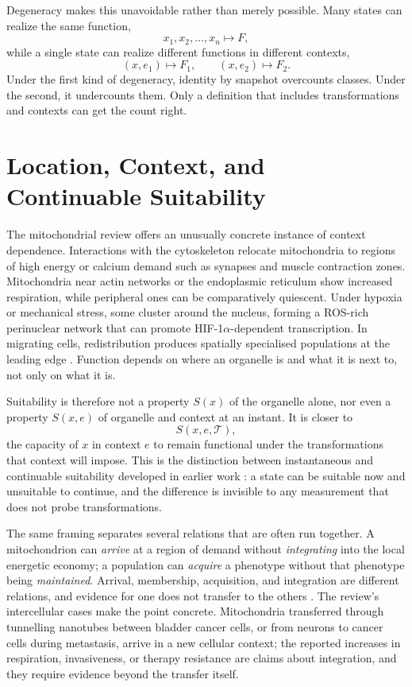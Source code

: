 \documentclass[11pt]{article}
\theoremstyle{remark}
\begin{document}
Degeneracy makes this unavoidable rather than merely possible. Many states can realize the same function,
\[
x_1, x_2, \dots, x_n \longmapsto F,
\]
while a single state can realize different functions in different contexts,
\[
(x, e_1)\mapsto F_1,\qquad (x, e_2)\mapsto F_2.
\]
Under the first kind of degeneracy, identity by snapshot overcounts classes. Under the second, it undercounts them. Only a definition that includes transformations and contexts can get the count right.

\section{Location, Context, and Continuable Suitability}

The mitochondrial review offers an unusually concrete instance of context dependence. Interactions with the cytoskeleton relocate mitochondria to regions of high energy or calcium demand such as synapses and muscle contraction zones. Mitochondria near actin networks or the endoplasmic reticulum show increased respiration, while peripheral ones can be comparatively quiescent. Under hypoxia or mechanical stress, some cluster around the nucleus, forming a ROS-rich perinuclear network that can promote HIF-1$\alpha$-dependent transcription. In migrating cells, redistribution produces spatially specialised populations at the leading edge \cite{desmaison}. Function depends on where an organelle is and what it is next to, not only on what it is.

Suitability is therefore not a property $S(x)$ of the organelle alone, nor even a property $S(x,e)$ of organelle and context at an instant. It is closer to
\[
S(x, e, \mathcal T),
\]
the capacity of $x$ in context $e$ to remain functional under the transformations that context will impose. This is the distinction between instantaneous and continuable suitability developed in earlier work \cite{continuable}: a state can be suitable now and unsuitable to continue, and the difference is invisible to any measurement that does not probe transformations.

The same framing separates several relations that are often run together. A mitochondrion can \emph{arrive} at a region of demand without \emph{integrating} into the local energetic economy; a population can \emph{acquire} a phenotype without that phenotype being \emph{maintained}. Arrival, membership, acquisition, and integration are different relations, and evidence for one does not transfer to the others \cite{arrival}. The review's intercellular cases make the point concrete. Mitochondria transferred through tunnelling nanotubes between bladder cancer cells, or from neurons to cancer cells during metastasis, arrive in a new cellular context; the reported increases in respiration, invasiveness, or therapy resistance are claims about integration, and they require evidence beyond the transfer itself.
\end{document}

